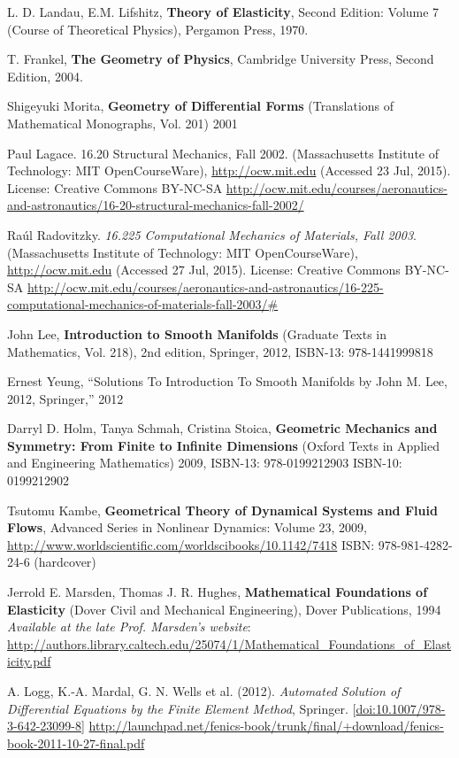 \documentclass[twoside,landscape,10pt]{amsart}
\theoremstyle{plain}
\theoremstyle{definition}
\theoremstyle{remark}
\begin{document}
\begin{thebibliography}{9}

L. D. Landau, E.M. Lifshitz, \textbf{Theory of Elasticity}, Second Edition: Volume 7 (Course of Theoretical Physics), Pergamon Press, 1970.  



T. Frankel,
\textbf{The Geometry of Physics}, 
Cambridge University Press, 
Second Edition,
2004.

Shigeyuki Morita, \textbf{Geometry of Differential Forms} (Translations of Mathematical Monographs, Vol. 201)  2001


Paul Lagace. 16.20 Structural Mechanics, Fall 2002. (Massachusetts Institute of Technology: MIT OpenCourseWare), \url{http://ocw.mit.edu} (Accessed 23 Jul, 2015). License: Creative Commons BY-NC-SA \url{http://ocw.mit.edu/courses/aeronautics-and-astronautics/16-20-structural-mechanics-fall-2002/}

Ra\'ul Radovitzky. \emph{16.225 Computational Mechanics of Materials, Fall 2003}. (Massachusetts Institute of Technology: MIT OpenCourseWare), \url{http://ocw.mit.edu} (Accessed 27 Jul, 2015). License: Creative Commons BY-NC-SA \url{http://ocw.mit.edu/courses/aeronautics-and-astronautics/16-225-computational-mechanics-of-materials-fall-2003/#}

John Lee, \textbf{Introduction to Smooth Manifolds} (Graduate Texts in Mathematics, Vol. 218), 2nd edition, Springer,  2012, ISBN-13: 978-1441999818


Ernest Yeung, ``Solutions To Introduction To Smooth Manifolds by John M. Lee, 2012, Springer,'' 2012

Darryl D. Holm, Tanya Schmah, Cristina Stoica, \textbf{Geometric Mechanics and Symmetry: From Finite to Infinite Dimensions} (Oxford Texts in Applied and Engineering Mathematics) 2009,  ISBN-13: 978-0199212903  ISBN-10: 0199212902  

Tsutomu Kambe, \textbf{Geometrical Theory of Dynamical Systems and Fluid Flows}, Advanced Series in Nonlinear Dynamics: Volume 23, 2009, \url{http://www.worldscientific.com/worldscibooks/10.1142/7418} ISBN: 978-981-4282-24-6 (hardcover)


Jerrold E. Marsden, Thomas J. R. Hughes, \textbf{Mathematical Foundations of Elasticity} (Dover Civil and Mechanical Engineering), Dover Publications, 1994 \emph{Available at the late Prof. Marsden's website}: \url{http://authors.library.caltech.edu/25074/1/Mathematical_Foundations_of_Elasticity.pdf} 

A. Logg, K.-A. Mardal, G. N. Wells et al. (2012). \emph{Automated Solution of Differential Equations by the Finite Element Method}, Springer. [\href{http://dx.doi.org/10.1007/978-3-642-23099-8}{doi:10.1007/978-3-642-23099-8}] \url{http://launchpad.net/fenics-book/trunk/final/+download/fenics-book-2011-10-27-final.pdf}

\end{thebibliography}
\end{document}
